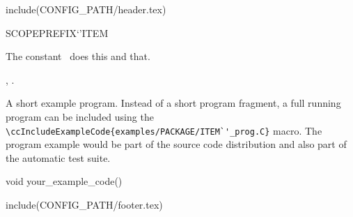 include(CONFIG_PATH/header.tex)
\begin{ccRefConstant}SCOPE{PREFIX`'ITEM}  %


\ccDefinition
  
The constant \ccRefName\ does this and that.



\ccSeeAlso

,
.

\ccExample

A short example program.
Instead of a short program fragment, a full running program can be
included using the 
\verb|\ccIncludeExampleCode{examples/PACKAGE/ITEM`'_prog.C}| 
macro. The program example would be part of the source code distribution and
also part of the automatic test suite.

\begin{ccExampleCode}
void your_example_code() {
}
\end{ccExampleCode}


\end{ccRefConstant}

include(CONFIG_PATH/footer.tex)
